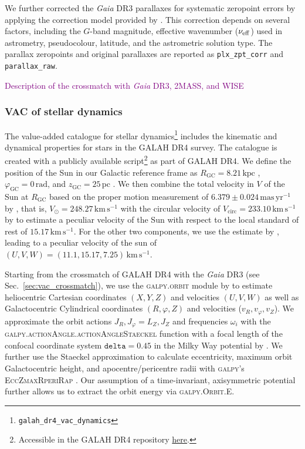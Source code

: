\documentclass[
  journal=pasa,
  manuscript=research-paper, %
  year=2024,
  volume=37
]{cup-journal}
\newcommand{\SB}[1]{{\textcolor{purple}{#1}}}
\newcommand{\Gaia}{\textit{Gaia}\xspace}
\begin{document}
We further corrected the \Gaia DR3 parallaxes for systematic zeropoint errors by applying the correction model provided by \citet{Lindegren2021b}. This correction depends on several factors, including the \(G\)-band magnitude, effective wavenumber (\(\nu_{\rm eff}\)) used in astrometry, pseudocolour, latitude, and the astrometric solution type. The parallax zeropoints and original parallaxes are reported as \texttt{plx\_zpt\_corr} and \texttt{parallax\_raw}.

\SB{Description of the crossmatch with \Gaia DR3, 2MASS, and WISE}

\subsubsection{VAC of stellar dynamics}
\label{sec:vac_dynamics}

The value-added catalogue for stellar dynamics\footnote{\texttt{galah\_dr4\_vac\_dynamics}} includes the kinematic and dynamical properties for stars in the GALAH DR4 survey. The catalogue is created with a publicly available script\footnote{Accessible in the GALAH DR4 repository \href{https://github.com/svenbuder/GALAH_DR4/blob/main/catalogs/create_galah_dr4_vac_dynamics.ipynb}{here}.} as part of GALAH DR4. 
We define the position of the Sun in our Galactic reference frame as $R_\mathrm{GC} = 8.21\,\mathrm{kpc}$ \citep{McMillan2017}, $\varphi_\mathrm{GC} = 0\,\mathrm{rad}$, and $z_\mathrm{GC} = 25\,\mathrm{pc}$ \citep{BlandHawthorn_Gerhard2016}. We then combine the total velocity  in $V$ of the Sun at $R_\mathrm{GC}$ based on the proper motion measurement of $6.379\pm0.024\,\mathrm{mas\,yr^{-1}}$ by \citep{Reid2004}, that is, $V_\odot = 248.27\,\mathrm{km\,s^{-1}}$ with the circular velocity of $V_\mathrm{circ} = 233.10\,\mathrm{km\,s^{-1}}$ by \citet{McMillan2017} to estimate a peculiar velocity of the Sun with respect to the local standard of rest of  $15.17\,\mathrm{km\,s^{-1}}$. For the other two components, we use the estimate by \citet{Schoenrich2010}, leading to a peculiar velocity of the sun of $(U,V,W) = (11.1, 15.17, 7.25)\,\mathrm{km\,s^{-1}}$.

Starting from the crossmatch of GALAH DR4 with the \Gaia DR3 (see Sec.~\ref{sec:vac_crossmatch}), we use the \textsc{galpy.orbit} module by \citet{Bovy2015} to estimate heliocentric Cartesian coordinates $(X,Y,Z)$ and velocities $(U,V,W)$ as well as Galactocentric Cylindrical coordinates $(R, \varphi, Z)$ and velocities ($v_R, v_\varphi, v_Z$). We approximate the orbit actions $J_R, J_\varphi = L_Z, J_Z$ and frequencies $\omega_i$ with the \textsc{galpy.actionAngle.actionAngleStaeckel} function with a focal length of the confocal coordinate system $\texttt{delta} = 0.45$ in the Milky Way potential by \citet{McMillan2017}. We further use the Staeckel approximation \citep{Binney2012} to calculate eccentricity, maximum orbit Galactocentric height, and apocentre/pericentre radii with \textsc{galpy}'s \textsc{EccZmaxRperiRap} \citep{Mackereth2018}. Our assumption of a time-invariant, axisymmetric potential further allows us to extract the orbit energy via \textsc{galpy.Orbit.E}.
\end{document}
